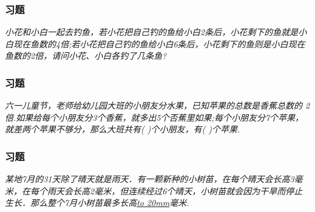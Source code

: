 \begin{frame}
    \frametitle{习题\theframecounter}
    \vspace*{-3cm}
    \textit{小花和小白一起去钓鱼，若小花把自己钓的鱼给小白2条后，小花剩下的鱼就是小白现在鱼数的4倍;若小花把自己钓的鱼给小白6条后，小花剩下的鱼则是小白现在鱼数的2倍，请问小花、小白各钓了几条鱼?} 
\end{frame}

\begin{frame}
    \frametitle{习题\theframecounter}
    \vspace*{-3cm}
    \textit{六一儿童节，老师给幼儿园大班的小朋友分水果，已知苹果的总数是香蕉总数的 2 倍.如果给每个小朋友分3个香蕉，就多出5个否蕉里如果;每个小朋友分7个苹果，就差两个苹果不够分，那么大班共有( )个小朋友，有( )个苹果.} 
\end{frame}


\begin{frame}
    \frametitle{习题\theframecounter}
    \vspace*{-3cm}
    \textit{某地7月的31天除了晴天就是雨天．有一颗新种的小树苗，在每个晴天会长高3毫米，在每个雨天会长高2毫米，但连续经过6个晴天，小树苗就会因为干旱而停止生长．那么整个7月小树苗最多长高\underline{\hbox to 20mm{}}毫米.} 
\end{frame}
